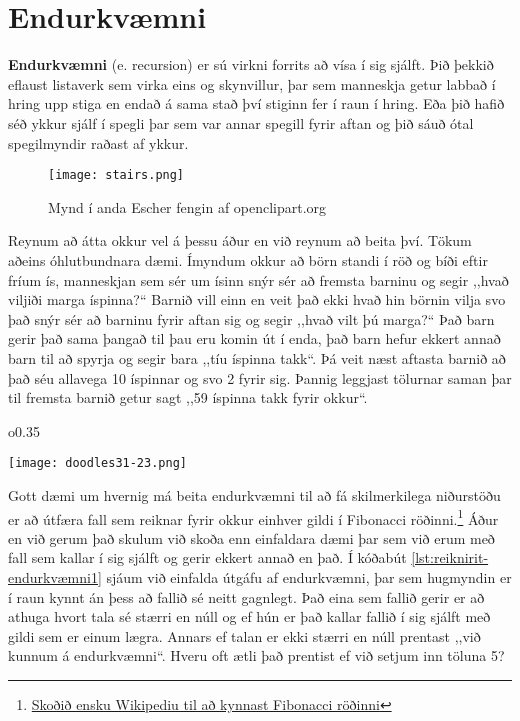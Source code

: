 \section{Endurkvæmni}\label{uk:reiknirit-endurkvæmni}
\textbf{Endurkvæmni} (e. recursion) er sú virkni forrits að vísa í sig sjálft.
Þið þekkið eflaust listaverk sem virka eins og skynvillur, þar sem manneskja getur labbað í hring upp stiga en endað á sama stað því stiginn fer í raun í hring. 
Eða þið hafið séð ykkur sjálf í spegli þar sem var annar spegill fyrir aftan og þið sáuð ótal spegilmyndir raðast af ykkur.
\begin{figure}[h]
	\centering
	\texttt{[image: stairs.png]}
	\caption{Mynd í anda Escher fengin af openclipart.org}
	\label{fig: Escher}
\end{figure}

Reynum að átta okkur vel á þessu áður en við reynum að beita því.
Tökum aðeins óhlutbundnara dæmi.
Ímyndum okkur að börn standi í röð og bíði eftir fríum ís, manneskjan sem sér um ísinn snýr sér að fremsta barninu og segir ,,hvað viljiði marga íspinna?“
Barnið vill einn en veit það ekki hvað hin börnin vilja svo það snýr sér að barninu fyrir aftan sig og segir ,,hvað vilt þú marga?“ 
Það barn gerir það sama þangað til þau eru komin út í enda, það barn hefur ekkert annað barn til að spyrja og segir bara ,,tíu íspinna takk“.
Þá veit næst aftasta barnið að það séu allavega 10 íspinnar og svo 2 fyrir sig.
Þannig leggjast tölurnar saman þar til fremsta barnið getur sagt ,,59 íspinna takk fyrir okkur“.


\begin{wrapfigure}{o}{0.35\textwidth} %
	\begin{center}
		\texttt{[image: doodles31-23.png]}
	\end{center}
\end{wrapfigure}
Gott dæmi um hvernig má beita endurkvæmni til að fá skilmerkilega niðurstöðu er að útfæra fall sem reiknar fyrir okkur einhver gildi í Fibonacci röðinni.\footnote{\href{https://en.wikipedia.org/wiki/Fibonacci_number}{Skoðið ensku Wikipediu til að kynnast Fibonacci röðinni}}
Áður en við gerum það skulum við skoða enn einfaldara dæmi þar sem við erum með fall sem kallar í sig sjálft og gerir ekkert annað en það.
Í kóðabút \ref{lst:reiknirit-endurkvæmni1} sjáum við einfalda útgáfu af endurkvæmni, þar sem hugmyndin er í raun kynnt án þess að fallið sé neitt gagnlegt.
Það eina sem fallið gerir er að athuga hvort tala sé stærri en núll og ef hún er það kallar fallið í sig sjálft með gildi sem er einum lægra.
Annars ef talan er ekki stærri en núll prentast ,,við kunnum á endurkvæmni“.
Hveru oft ætli það prentist ef við setjum inn töluna 5?

